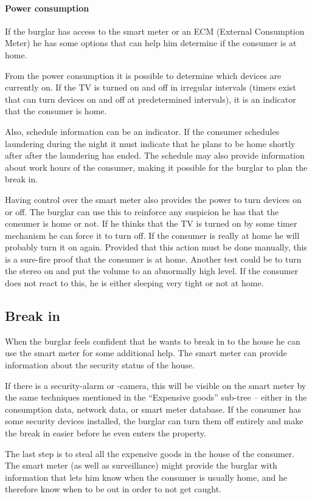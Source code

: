 \paragraph{Power consumption}
If the burglar has access to the smart meter or an ECM (External Consumption Meter) he has some options that can help him determine if the consumer is at home.

From the power consumption it is possible to determine which devices are currently on. 
If the TV is turned on and off in irregular intervals (timers exist that can turn devices on and off at predetermined intervals), it is an indicator that the consumer is home.

Also, schedule information can be an indicator.
If the consumer schedules laundering during the night it must indicate that he plans to be home shortly after after the laundering has ended.
The schedule may also provide information about work hours of the consumer, making it possible for the burglar to plan the break in.

Having control over the smart meter also provides the power to turn devices on or off.
The burglar can use this to reinforce any suspicion he has that the consumer is home or not.
If he thinks that the TV is turned on by some timer mechanism he can force it to turn off.
If the consumer is really at home he will probably turn it on again.
Provided that this action must be done manually, this is a sure-fire proof that the consumer is at home.
Another test could be to turn the stereo on and put the volume to an abnormally high level.
If the consumer does not react to this, he is either sleeping very tight or not at home.

\subsection{Break in}
When the burglar feels confident that he wants to break in to the house he can use the smart meter for some additional help.
The smart meter can provide information about the security status of the house.

If there is a security-alarm or -camera, this will be visible on the smart meter by the same techniques mentioned in the ``Expensive goods'' sub-tree -- either in the consumption data, network data, or smart meter database.
If the consumer has some security devices installed, the burglar can turn them off entirely and make the break in easier before he even enters the property.

The last step is to steal all the expensive goods in the house of the consumer.
The smart meter (as well as surveillance) might provide the burglar with information that lets him know when the consumer is usually home, and he therefore know when to be out in order to not get caught.

